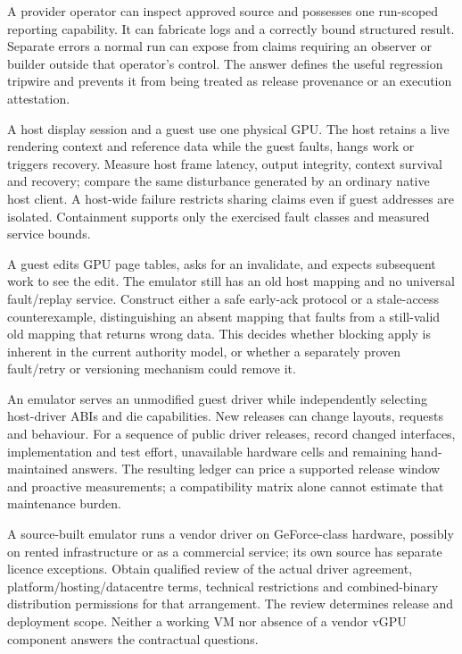 {A provider operator can inspect approved source and possesses one run-scoped reporting
capability. It can fabricate logs and a correctly bound structured result.}
{Separate errors a normal run can expose from claims requiring an observer or builder outside that
operator's control.}
{The answer defines the useful regression tripwire and prevents it from being treated as release
provenance or an execution attestation.}
\label{q:rental}

{A host display session and a guest use one physical GPU. The host retains a live rendering
context and reference data while the guest faults, hangs work or triggers recovery.}
{Measure host frame latency, output integrity, context survival and recovery; compare the same
disturbance generated by an ordinary native host client.}
{A host-wide failure restricts sharing claims even if guest addresses are isolated. Containment
supports only the exercised fault classes and measured service bounds.}
\label{q:host}

{A guest edits GPU page tables, asks for an invalidate, and expects subsequent work to see the
edit. The emulator still has an old host mapping and no universal fault/replay service.}
{Construct either a safe early-ack protocol or a stale-access counterexample, distinguishing an
absent mapping that faults from a still-valid old mapping that returns wrong data.}
{This decides whether blocking apply is inherent in the current authority model, or whether a
separately proven fault/retry or versioning mechanism could remove it.}
\label{q:early}

{An emulator serves an unmodified guest driver while independently selecting host-driver ABIs and
die capabilities. New releases can change layouts, requests and behaviour.}
{For a sequence of public driver releases, record changed interfaces, implementation and test
effort, unavailable hardware cells and remaining hand-maintained answers.}
{The resulting ledger can price a supported release window and proactive measurements; a
compatibility matrix alone cannot estimate that maintenance burden.}
\label{q:releasecost}

{A source-built emulator runs a vendor driver on GeForce-class hardware, possibly on rented
infrastructure or as a commercial service; its own source has separate licence exceptions.}
{Obtain qualified review of the actual driver agreement, platform/hosting/datacentre terms,
technical restrictions and combined-binary distribution permissions for that arrangement.}
{The review determines release and deployment scope. Neither a working VM nor absence of a vendor
vGPU component answers the contractual questions.}
\label{q:eula}

